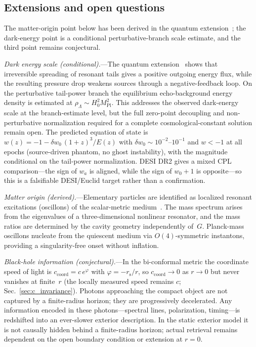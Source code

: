 \documentclass[aps,prd,onecolumn,superscriptaddress,nofootinbib,showpacs,12pt]{revtex4-2}
\newcommand{\Mpl}{M_{\mathrm{Pl}}}
\newcommand{\rs}{r_{\mathrm{s}}}
\begin{document}
\subsection{Extensions and open questions}\label{sec:speculative}

The matter-origin point below has been derived in
the quantum extension~\cite{Lotishvili2026Q}; the
dark-energy point is a conditional perturbative-branch
scale estimate, and the third point remains conjectural.

\textit{Dark energy scale (conditional).}---The quantum
extension~\cite{Lotishvili2026Q} shows that irreversible
spreading of resonant tails gives a positive outgoing
energy flux, while the resulting pressure drop weakens
sources through a negative-feedback loop.  On the
perturbative tail-power branch the equilibrium
echo-background energy density is estimated at
$\rho_{\Lambda} \sim H_{0}^{2}\Mpl^{2}$.  This addresses
the observed dark-energy scale at the branch-estimate level,
but the full zero-point decoupling and non-perturbative
normalization required for a complete cosmological-constant
solution remain open.  The predicted equation of state is
$w(z) = -1 - \delta w_{0}\,(1+z)^{3}/E(z)$ with
$\delta w_{0} \sim 10^{-2}$--$10^{-1}$ and $w < -1$
at all epochs (source-driven phantom, no ghost instability),
with the magnitude conditional on the tail-power normalization.
DESI DR2 gives a mixed CPL comparison---the sign of $w_a$
is aligned, while the sign of $w_0+1$ is opposite---so this
is a falsifiable DESI/Euclid target rather than a confirmation.

\textit{Matter origin (derived).}---Elementary
particles are identified as localized resonant
excitations (oscillons) of the scalar-metric
medium~\cite{Lotishvili2026Q}.  The mass spectrum
arises from the eigenvalues of a three-dimensional
nonlinear resonator, and the mass ratios are
determined by the cavity geometry independently of~$G$.
Planck-mass oscillons nucleate from the quiescent
medium via $O(4)$-symmetric instantons, providing
a singularity-free onset without inflation.

\textit{Black-hole information (conjectural).}---In
the bi-conformal metric the coordinate speed of light is
$c_{\mathrm{coord}} = c\,e^{\varphi}$ with
$\varphi = -\rs/r$, so $c_{\mathrm{coord}}\to 0$
as $r\to 0$ but never vanishes at finite~$r$
(the locally measured speed remains $c$;
Sec.~\ref{sec:c_invariance}).
Photons approaching the compact object are not
captured by a finite-radius horizon; they are progressively
decelerated.  Any information encoded in these
photons---spectral lines, polarization, timing---is
redshifted into an ever-slower exterior description.
In the static exterior model it is not causally hidden
behind a finite-radius horizon; actual retrieval remains
dependent on the open boundary condition or extension
at $r=0$.
\end{document}
